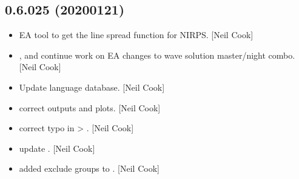 \documentclass[a4paper,10pt,english]{report}
\begin{document}
\subsection{0.6.025 (2020\sphinxhyphen{}01\sphinxhyphen{}21)}
\label{\detokenize{misc/changelog:id12}}\begin{itemize}
\item {} 
 \sphinxhyphen{} EA tool to get the line spread function for
NIRPS. {[}Neil Cook{]}

\item {} 
,  and
 \sphinxhyphen{} continue work on EA changes to wave solution
master/night combo. {[}Neil Cook{]}

\item {} 
Update language database. {[}Neil Cook{]}

\item {} 
 \sphinxhyphen{} correct 
outputs and plots. {[}Neil Cook{]}

\item {} 
 \sphinxhyphen{} correct typo in
  \textendash{}\textgreater{} . {[}Neil Cook{]}

\item {} 
 \sphinxhyphen{} update
. {[}Neil Cook{]}

\item {} 
 \sphinxhyphen{} added exclude groups to .
{[}Neil Cook{]}

\end{itemize}
\end{document}
